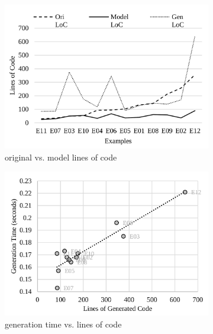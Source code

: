 \documentclass[sigconf,review]{acmart}
\begin{document}
{	\begin{figure}
		\centering
		\begin{subfigure}{0.33\textwidth}
			\includegraphics[width=\textwidth]{figures/eval-productivity.pdf}
			\caption{original vs. model lines of code}
			\label{fig:eval-productivity}
		\end{subfigure}
		\hfill
		\begin{subfigure}{0.33\textwidth}
			\includegraphics[width=\textwidth]{figures/eval-generation-time.pdf}
			\caption{generation time vs. lines of code}
			\label{fig:eval-generation-time}
		\end{subfigure}
		\hfill
		\begin{subfigure}{0.33\textwidth}

\end{subfigure}
\end{figure}}
\end{document}
